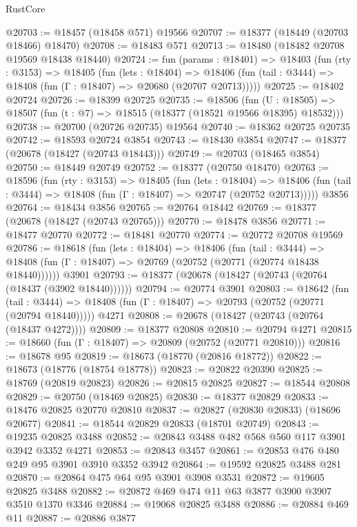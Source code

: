 \begin{lexlean}{RustCore}
\begin{coremodule}
@20703 := @18457 (@18458 @571) @19566
@20707 := @18377 (@18449 (@20703 @18466) @18470)
@20708 := @18483 @571
@20713 := @18480 (@18482 @20708 @19569 @18438 @18440)
@20724 := fun (params : @18401) =>
  @18403
    (fun (rty : @3153) =>
    @18405
      (fun (lets : @18404) =>
      @18406 (fun (tail : @3444) => @18408 (fun (Γ : @18407) => @20680 (@20707 @20713)))))
@20725 := @18402 @20724
@20726 := @18399 @20725
@20735 := @18506
    (fun (U : @18505) => @18507 (fun (t : @7) => @18515 (@18377 (@18521 @19566 @18395) @18532)))
@20738 := @20700 (@20726 @20735) @19564
@20740 := @18362 @20725 @20735
@20742 := @18593 @20724 @3854
@20743 := @18430 @3854
@20747 := @18377 (@20678 (@18427 (@20743 @18443)))
@20749 := @20703 (@18465 @3854)
@20750 := @18449 @20749
@20752 := @18377 (@20750 @18470)
@20763 := @18596
    (fun (rty : @3153) =>
    @18405
      (fun (lets : @18404) =>
      @18406 (fun (tail : @3444) => @18408 (fun (Γ : @18407) => @20747 (@20752 @20713)))))
    @3856
@20764 := @18434 @3856
@20765 := @20764 @18442
@20769 := @18377 (@20678 (@18427 (@20743 @20765)))
@20770 := @18478 @3856
@20771 := @18477 @20770
@20772 := @18481 @20770
@20774 := @20772 @20708 @19569
@20786 := @18618
    (fun (lets : @18404) =>
    @18406
      (fun (tail : @3444) =>
      @18408 (fun (Γ : @18407) => @20769 (@20752 (@20771 (@20774 @18438 @18440))))))
    @3901
@20793 := @18377 (@20678 (@18427 (@20743 (@20764 (@18437 (@3902 @18440))))))
@20794 := @20774 @3901
@20803 := @18642
    (fun (tail : @3444) => @18408 (fun (Γ : @18407) => @20793 (@20752 (@20771 (@20794 @18440)))))
    @4271
@20808 := @20678 (@18427 (@20743 (@20764 (@18437 @4272))))
@20809 := @18377 @20808
@20810 := @20794 @4271
@20815 := @18660 (fun (Γ : @18407) => @20809 (@20752 (@20771 @20810)))
@20816 := @18678 @95
@20819 := @18673 (@18770 (@20816 @18772))
@20822 := @18673 (@18776 (@18754 @18778))
@20823 := @20822 @20390
@20825 := @18769 (@20819 @20823)
@20826 := @20815 @20825
@20827 := @18544 @20808
@20829 := @20750 (@18469 @20825)
@20830 := @18377 @20829
@20833 := @18476 @20825 @20770 @20810
@20837 := @20827 (@20830 @20833) (@18696 @20677)
@20841 := @18544 @20829 @20833 (@18701 @20749)
@20843 := @19235 @20825 @3488
@20852 := @20843 @3488 @482 @568 @560 @117 @3901 @3942 @3352 @4271
@20853 := @20843 @3457
@20861 := @20853 @476 @480 @249 @95 @3901 @3910 @3352 @3942
@20864 := @19592 @20825 @3488 @281
@20870 := @20864 @475 @64 @95 @3901 @3908 @3531
@20872 := @19605 @20825 @3488
@20882 := @20872 @469 @474 @11 @63 @3877 @3900 @3907 @3510 @1370 @3346
@20884 := @19068 @20825 @3488
@20886 := @20884 @469 @11
@20887 := @20886 @3877

\end{coremodule}
\end{lexlean}
